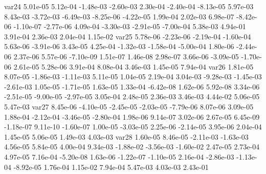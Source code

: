 var24  5.01e-05  5.12e-04 -1.48e-03 -2.60e-03  2.30e-04 -2.40e-04 -8.13e-05  5.97e-03  8.43e-03 -3.72e-03 -6.49e-03 -8.25e-06 -4.22e-05  1.99e-04  2.02e-03  6.98e-07 -8.42e-06 -1.10e-07 -2.77e-06  4.09e-04 -3.30e-03 -2.91e-05 -7.00e-04  5.38e-03  4.94e-01  3.91e-04  2.36e-03  2.04e-04  1.15e-02
var25  5.78e-06 -2.23e-06 -2.19e-04 -1.60e-04  5.63e-06 -3.91e-06  3.43e-05  4.25e-04 -1.32e-03 -1.58e-04 -5.00e-04  1.80e-06 -2.44e-06  2.37e-06  5.57e-06 -7.10e-09  1.51e-07  1.46e-08  2.98e-07  3.66e-06 -3.09e-05 -1.70e-06  2.61e-05  5.28e-06  3.91e-04  8.08e-04  3.46e-03  1.45e-05  7.94e-04
var26  1.81e-05  8.07e-05 -1.86e-03 -1.11e-03  5.11e-05  1.04e-05  2.19e-04  3.04e-03 -9.28e-03 -1.45e-03 -2.61e-03  1.05e-05 -1.71e-05  1.63e-05  1.33e-04 -6.42e-08  1.62e-06  5.92e-08  3.34e-06 -2.51e-05 -9.00e-05 -2.97e-05  3.05e-04  2.48e-05  2.36e-03  3.46e-03  4.44e-02  5.06e-05  5.47e-03
var27  8.45e-06 -4.10e-05 -2.45e-05 -2.03e-05 -7.79e-06  8.07e-06  3.09e-05  1.88e-04 -2.12e-04 -3.46e-05 -2.80e-04  1.98e-06  9.14e-07  3.02e-06  2.67e-05  6.45e-09 -1.18e-07  9.11e-10 -1.60e-07  1.00e-05 -3.03e-05  2.25e-06 -2.14e-05  3.95e-06  2.04e-04  1.45e-05  5.06e-05  1.49e-03  4.03e-03
var28  1.60e-05  8.46e-05 -2.11e-03 -1.63e-03  4.56e-05  5.84e-05  4.00e-04  9.34e-03 -1.88e-02 -3.56e-03 -1.60e-02  2.47e-05  2.73e-04  4.97e-05  7.16e-04 -5.20e-08  1.63e-06 -1.22e-07 -1.10e-05  2.16e-04 -2.86e-03 -1.13e-04 -8.92e-05  1.76e-04  1.15e-02  7.94e-04  5.47e-03  4.03e-03  2.43e-01


